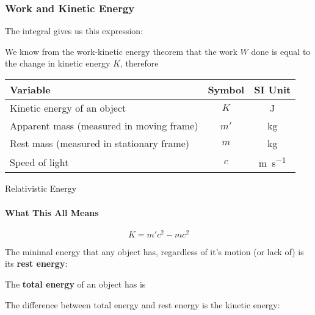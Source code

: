 \documentclass[12pt,compress,aspectratio=169]{beamer}
\newcommand{\eq}[2]{\vspace{#1}{\Large\begin{displaymath}#2\end{displaymath}}}
\begin{document}
\begin{frame}
  \frametitle{Work and Kinetic Energy}

  The integral gives us this expression:
  
  \eq{-.15in}{
    W=\gamma mc^2-mc^2
  }

  \vspace{-.15in}We know from the work-kinetic energy theorem that the work $W$
  done is equal to the change in kinetic energy $K$, therefore
  
  \eq{-.2in}{ \boxed{K=m'c^2-mc^2} }

  \vspace{-.1in}
  \begin{center}
    \begin{tabular}{l|c|c}
      \rowcolor{pink}
      \textbf{Variable} & \textbf{Symbol} & \textbf{SI Unit}\\ \hline
      Kinetic energy of an object & $K$  & \si{\joule}\\
      Apparent mass (measured in moving frame) & $m'$ & \si{\kilo\gram}\\
      Rest mass (measured in stationary frame) & $m$  & \si{\kilo\gram}\\
      Speed of light              & $c$ & \si{\metre\per\second}
    \end{tabular}
  \end{center}
\end{frame}



\begin{frame}{Relativistic Energy}
  \framesubtitle{What This All Means}
  {\Large
    \begin{displaymath}
      \boxed{K=m'c^2-mc^2}
    \end{displaymath}
  }

  The minimal energy that any object has, regardless of it's motion (or lack
  of) is its \textbf{rest energy}:
  
  \eq{-.4in}{ E_0=mc^2 }

  \vspace{-.2in}The \textbf{total energy} of an object has is
    
  \eq{-.3in}{
    E_T=m'c^2=\gamma mc^2
  }

  \vspace{-.2in}The difference between total energy and rest energy is the
  kinetic energy:

  \eq{-.3in}{
    K=E_T-E_0
  }
\end{frame}
\end{document}
